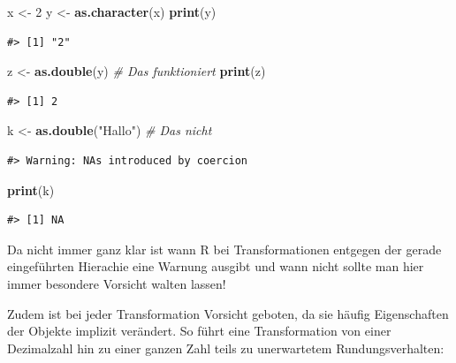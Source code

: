 \documentclass[]{tufte-book}
\newenvironment{Shaded}{}{}
\newcommand{\KeywordTok}[1]{\textcolor[rgb]{0.00,0.44,0.13}{\textbf{#1}}}
\newcommand{\DecValTok}[1]{\textcolor[rgb]{0.25,0.63,0.44}{#1}}
\newcommand{\StringTok}[1]{\textcolor[rgb]{0.25,0.44,0.63}{#1}}
\newcommand{\CommentTok}[1]{\textcolor[rgb]{0.38,0.63,0.69}{\textit{#1}}}
\newcommand{\NormalTok}[1]{#1}
\begin{document}
\begin{Shaded}
\begin{Highlighting}[]
\NormalTok{x <-}\StringTok{ }\DecValTok{2}
\NormalTok{y <-}\StringTok{ }\KeywordTok{as.character}\NormalTok{(x)}
\KeywordTok{print}\NormalTok{(y)}
\end{Highlighting}
\end{Shaded}

\begin{verbatim}
#> [1] "2"
\end{verbatim}

\begin{Shaded}
\begin{Highlighting}[]
\NormalTok{z <-}\StringTok{ }\KeywordTok{as.double}\NormalTok{(y)  }\CommentTok{# Das funktioniert}
\KeywordTok{print}\NormalTok{(z)}
\end{Highlighting}
\end{Shaded}

\begin{verbatim}
#> [1] 2
\end{verbatim}

\begin{Shaded}
\begin{Highlighting}[]
\NormalTok{k <-}\StringTok{ }\KeywordTok{as.double}\NormalTok{(}\StringTok{"Hallo"}\NormalTok{)  }\CommentTok{# Das nicht}
\end{Highlighting}
\end{Shaded}

\begin{verbatim}
#> Warning: NAs introduced by coercion
\end{verbatim}

\begin{Shaded}
\begin{Highlighting}[]
\KeywordTok{print}\NormalTok{(k)}
\end{Highlighting}
\end{Shaded}

\begin{verbatim}
#> [1] NA
\end{verbatim}

Da nicht immer ganz klar ist wann R bei Transformationen entgegen der
gerade eingeführten Hierachie eine Warnung ausgibt und wann nicht sollte
man hier immer besondere Vorsicht walten lassen!

Zudem ist bei jeder Transformation Vorsicht geboten, da sie häufig
Eigenschaften der Objekte implizit verändert. So führt eine
Transformation von einer Dezimalzahl hin zu einer ganzen Zahl teils zu
unerwartetem Rundungsverhalten:
\end{document}

